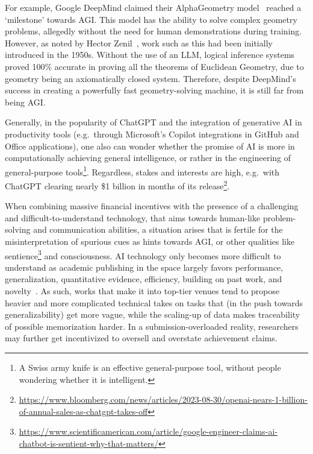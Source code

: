 \documentclass{article}
\theoremstyle{plain}
\theoremstyle{definition}
\theoremstyle{remark}
\begin{document}
For example, Google DeepMind claimed their AlphaGeometry model~\cite{trinh2024geometry} reached a `milestone' towards AGI. This model has the ability to solve complex geometry problems, allegedly without the need for human demonstrations during training. However, as noted by Hector Zenil~\cite{hector2024linkedin}, work such as this had been initially introduced in the 1950s. Without the use of an LLM, logical inference systems proved 100\% accurate in proving all the theorems of Euclidean Geometry, due to geometry being an axiomatically closed system. Therefore, despite DeepMind's success in creating a powerfully fast geometry-solving machine, it is still far from being AGI.

Generally, in the popularity of ChatGPT and the integration of generative AI in productivity tools (e.g.\ through Microsoft's Copilot integrations in GitHub and Office applications), one also can wonder whether the promise of AI is more in computationally achieving general intelligence, or rather in the engineering of general-purpose tools\footnote{A Swiss army knife is an effective general-purpose tool, without people wondering whether it is intelligent.}. Regardless, stakes and interests are high, e.g.\ with ChatGPT clearing nearly \$1 billion in months of its release\footnote{\url{https://www.bloomberg.com/news/articles/2023-08-30/openai-nears-1-billion-of-annual-sales-as-chatgpt-takes-off}}.

When combining massive financial incentives with the presence of a challenging and difficult-to-understand technology, that aims towards human-like problem-solving and communication abilities, a situation arises that is fertile for the misinterpretation of spurious cues as hints towards AGI, or other qualities like sentience\footnote{\url{https://www.scientificamerican.com/article/google-engineer-claims-ai-chatbot-is-sentient-why-that-matters/}} and consciousness. AI technology only becomes more difficult to understand as academic publishing in the space largely favors performance, generalization, quantitative evidence, efficiency, building on past work, and novelty~\cite{values_in_ML}. As such, works that make it into top-tier venues tend to propose heavier and more complicated technical takes on tasks that (in the push towards generalizability) get more vague, while the scaling-up of data makes traceability of possible memorization harder. In a submission-overloaded reality, researchers may further get incentivized to oversell and overstate achievement claims.
\end{document}
